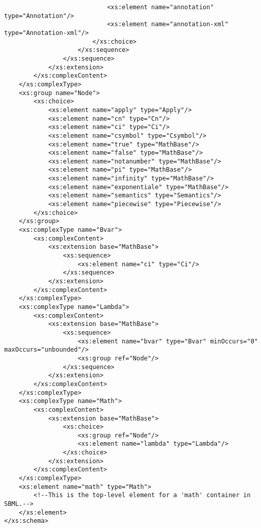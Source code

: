 \begin{footnotesize}
\begin{verbatim}
                            <xs:element name="annotation" type="Annotation"/>
                            <xs:element name="annotation-xml" type="Annotation-xml"/>
                        </xs:choice>
                    </xs:sequence>
                </xs:sequence>
            </xs:extension>
        </xs:complexContent>
    </xs:complexType>
    <xs:group name="Node">
        <xs:choice>
            <xs:element name="apply" type="Apply"/>
            <xs:element name="cn" type="Cn"/>
            <xs:element name="ci" type="Ci"/>
            <xs:element name="csymbol" type="Csymbol"/>
            <xs:element name="true" type="MathBase"/>
            <xs:element name="false" type="MathBase"/>
            <xs:element name="notanumber" type="MathBase"/>
            <xs:element name="pi" type="MathBase"/>
            <xs:element name="infinity" type="MathBase"/>
            <xs:element name="exponentiale" type="MathBase"/>
            <xs:element name="semantics" type="Semantics"/>
            <xs:element name="piecewise" type="Piecewise"/>
        </xs:choice>
    </xs:group>
    <xs:complexType name="Bvar">
        <xs:complexContent>
            <xs:extension base="MathBase">
                <xs:sequence>
                    <xs:element name="ci" type="Ci"/>
                </xs:sequence>
            </xs:extension>
        </xs:complexContent>
    </xs:complexType>
    <xs:complexType name="Lambda">
        <xs:complexContent>
            <xs:extension base="MathBase">
                <xs:sequence>
                    <xs:element name="bvar" type="Bvar" minOccurs="0" maxOccurs="unbounded"/>
                    <xs:group ref="Node"/>
                </xs:sequence>
            </xs:extension>
        </xs:complexContent>
    </xs:complexType>
    <xs:complexType name="Math">
        <xs:complexContent>
            <xs:extension base="MathBase">
                <xs:choice>
                    <xs:group ref="Node"/>
                    <xs:element name="lambda" type="Lambda"/>
                </xs:choice>
            </xs:extension>
        </xs:complexContent>
    </xs:complexType>
    <xs:element name="math" type="Math">
        <!--This is the top-level element for a 'math' container in SBML.-->
    </xs:element>
</xs:schema>
\end{verbatim}
\regularspacing
\end{footnotesize}
